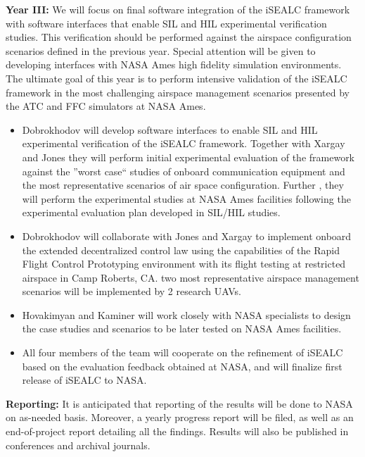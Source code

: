 \documentclass[letter,onecolumn,12pt]{aiaa-tc}
\newcommand{\1}{1_n}
\begin{document}
\textbf{Year III:} We will focus on final software integration of the iSEALC framework with software interfaces that
enable SIL and HIL experimental verification studies. This verification should be performed against the airspace
configuration scenarios defined in the previous year. Special attention will be given to developing interfaces with
NASA Ames high fidelity simulation environments. The ultimate goal of this year is to perform intensive validation
of the iSEALC framework in the most challenging airspace management scenarios presented by the ATC and FFC simulators
at NASA Ames.
\vspace{-3mm}
\begin{itemize}
\setlength{\itemsep}{-4pt}
    \item Dobrokhodov will develop software interfaces to enable SIL and HIL experimental verification of the iSEALC framework. Together with Xargay and Jones they will perform initial experimental evaluation of the framework against the ''worst case`` studies of onboard communication equipment and the most representative scenarios of air space configuration. Further , they will perform the experimental studies at NASA Ames facilities following the experimental evaluation plan developed in SIL/HIL studies.

    \item Dobrokhodov will collaborate with Jones and Xargay to implement onboard the extended decentralized control law using the capabilities of the Rapid Flight Control Prototyping environment with its flight testing at restricted airspace in Camp Roberts, CA. two most representative airspace management scenarios will be implemented by 2 research UAVs.

    \item Hovakimyan and Kaminer will work closely with NASA specialists to design the case studies and scenarios to be later tested on NASA Ames facilities.

    \item All four members of the team will cooperate on the refinement of iSEALC based on the evaluation feedback obtained at NASA, and will finalize first release of iSEALC to NASA.
\end{itemize}
\vspace{-2mm}

\textbf{Reporting:} It is anticipated that reporting of the results will be done to NASA on as-needed basis. Moreover, a yearly progress report will be filed, as well as an end-of-project report detailing all the findings. Results will also be published in conferences and archival journals.
\end{document}

